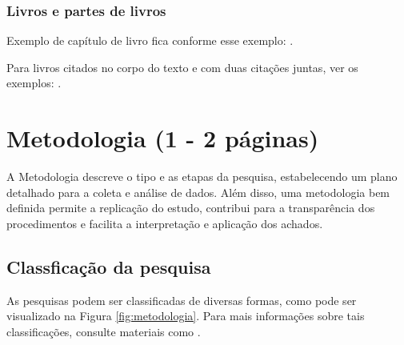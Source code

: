 \subsubsection{\esp Livros e partes de livros}

Exemplo de capítulo de livro fica conforme esse exemplo: \cite{cap-livro2005}.

Para livros citados no corpo do texto e com duas citações juntas, ver os exemplos: .

\newpage

\section{\esp Metodologia (1 - 2 páginas)}
A Metodologia descreve o tipo e as etapas da pesquisa, estabelecendo um plano detalhado para a coleta e análise de dados. Além disso, uma metodologia bem definida permite a replicação do estudo, contribui para a transparência dos procedimentos e facilita a interpretação e aplicação dos achados.

    \subsection{\esp Classficação da pesquisa}
As pesquisas podem ser classificadas de diversas formas, como pode ser visualizado na Figura \ref{fig:metodologia}. Para mais informações sobre tais classificações, consulte materiais como .

